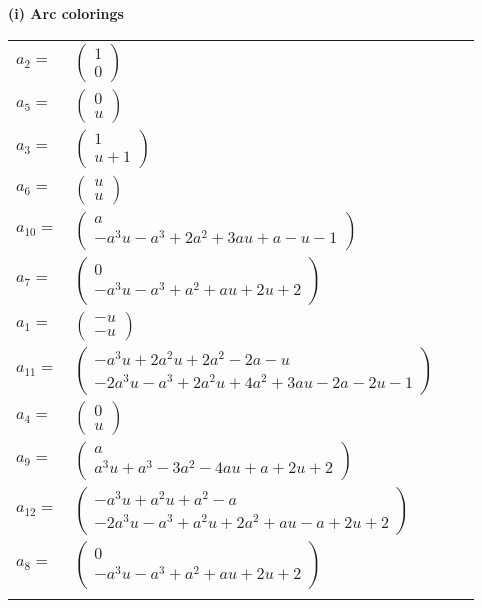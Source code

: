 \documentclass[1p]{elsarticle_modified}
\theoremstyle{definition}
\begin{document}
\flushleft \textbf{(i) Arc colorings}\\
\begin{tabular}{m{7pt} m{180pt} m{7pt} m{180pt} }
\flushright $a_{2}=$&$\begin{pmatrix}1\\0\end{pmatrix}$ \\
\flushright $a_{5}=$&$\begin{pmatrix}0\\u\end{pmatrix}$ \\
\flushright $a_{3}=$&$\begin{pmatrix}1\\u+1\end{pmatrix}$ \\
\flushright $a_{6}=$&$\begin{pmatrix}u\\u\end{pmatrix}$ \\
\flushright $a_{10}=$&$\begin{pmatrix}a\\- a^3 u- a^3+2 a^2+3 a u+a- u-1\end{pmatrix}$ \\
\flushright $a_{7}=$&$\begin{pmatrix}0\\- a^3 u- a^3+a^2+a u+2 u+2\end{pmatrix}$ \\
\flushright $a_{1}=$&$\begin{pmatrix}- u\\- u\end{pmatrix}$ \\
\flushright $a_{11}=$&$\begin{pmatrix}- a^3 u+2 a^2 u+2 a^2-2 a- u\\-2 a^3 u- a^3+2 a^2 u+4 a^2+3 a u-2 a-2 u-1\end{pmatrix}$ \\
\flushright $a_{4}=$&$\begin{pmatrix}0\\u\end{pmatrix}$ \\
\flushright $a_{9}=$&$\begin{pmatrix}a\\a^3 u+a^3-3 a^2-4 a u+a+2 u+2\end{pmatrix}$ \\
\flushright $a_{12}=$&$\begin{pmatrix}- a^3 u+a^2 u+a^2- a\\-2 a^3 u- a^3+a^2 u+2 a^2+a u- a+2 u+2\end{pmatrix}$ \\
\flushright $a_{8}=$&$\begin{pmatrix}0\\- a^3 u- a^3+a^2+a u+2 u+2\end{pmatrix}$\\&\end{tabular}
\end{document}
